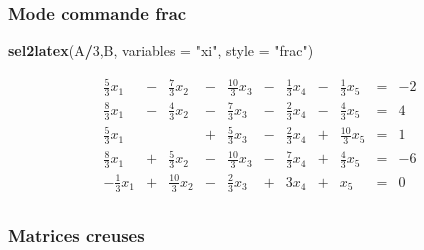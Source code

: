 \documentclass[]{article}
\newenvironment{Shaded}{\begin{snugshade}}{\end{snugshade}}
\newcommand{\DataTypeTok}[1]{\textcolor[rgb]{0.13,0.29,0.53}{#1}}
\newcommand{\DecValTok}[1]{\textcolor[rgb]{0.00,0.00,0.81}{#1}}
\newcommand{\KeywordTok}[1]{\textcolor[rgb]{0.13,0.29,0.53}{\textbf{#1}}}
\newcommand{\NormalTok}[1]{#1}
\newcommand{\OperatorTok}[1]{\textcolor[rgb]{0.81,0.36,0.00}{\textbf{#1}}}
\newcommand{\StringTok}[1]{\textcolor[rgb]{0.31,0.60,0.02}{#1}}
\begin{document}
\hypertarget{mode-commande-frac}{%
\subsubsection{Mode commande frac}\label{mode-commande-frac}}

\begin{Shaded}
\begin{Highlighting}[]
\KeywordTok{sel2latex}\NormalTok{(A}\OperatorTok{/}\DecValTok{3}\NormalTok{,B, }\DataTypeTok{variables =} \StringTok{"xi"}\NormalTok{, }\DataTypeTok{style =} \StringTok{"frac"}\NormalTok{)}
\end{Highlighting}
\end{Shaded}

\[
\begin{array}{rrrrrrrrrrr}
\frac{5}{3} x_{1} & - & \frac{7}{3} x_{2} & - & \frac{10}{3} x_{3} & - & \frac{1}{3} x_{4} & - & \frac{1}{3} x_{5} & = & -2 \\ 
\frac{8}{3} x_{1} & - & \frac{4}{3} x_{2} & - & \frac{7}{3} x_{3} & - & \frac{2}{3} x_{4} & - & \frac{4}{3} x_{5} & = & 4 \\ 
\frac{5}{3} x_{1} & & & + & \frac{5}{3} x_{3} & - & \frac{2}{3} x_{4} & + & \frac{10}{3} x_{5} & = & 1 \\ 
\frac{8}{3} x_{1} & + & \frac{5}{3} x_{2} & - & \frac{10}{3} x_{3} & - & \frac{7}{3} x_{4} & + & \frac{4}{3} x_{5} & = & -6 \\ 
-\frac{1}{3} x_{1} & + & \frac{10}{3} x_{2} & - & \frac{2}{3} x_{3} & + & 3 x_{4} & + & x_{5} & = & 0 \\ 
\end{array}
\]

\hypertarget{matrices-creuses}{%
\subsubsection{Matrices creuses}\label{matrices-creuses}}
\end{document}
